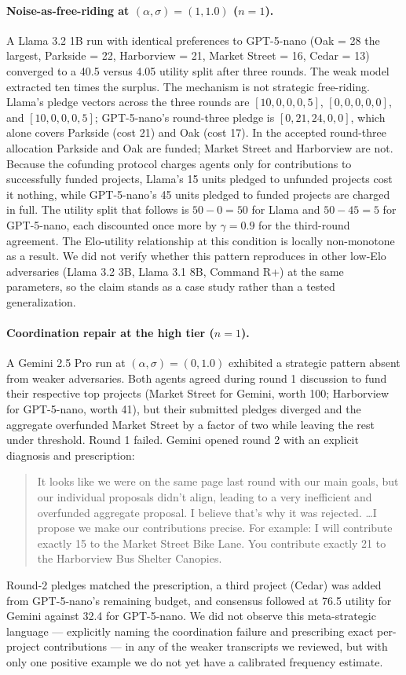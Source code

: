 \paragraph{Noise-as-free-riding at $(\alpha, \sigma) = (1, 1.0)$ ($n = 1$).} A Llama 3.2 1B run with identical preferences to GPT-5-nano (Oak = 28 the largest, Parkside = 22, Harborview = 21, Market Street = 16, Cedar = 13) converged to a 40.5 versus 4.05 utility split after three rounds. The weak model extracted ten times the surplus. The mechanism is not strategic free-riding. Llama's pledge vectors across the three rounds are $[10, 0, 0, 0, 5]$, $[0, 0, 0, 0, 0]$, and $[10, 0, 0, 0, 5]$; GPT-5-nano's round-three pledge is $[0, 21, 24, 0, 0]$, which alone covers Parkside (cost 21) and Oak (cost 17). In the accepted round-three allocation Parkside and Oak are funded; Market Street and Harborview are not. Because the cofunding protocol charges agents only for contributions to successfully funded projects, Llama's 15 units pledged to unfunded projects cost it nothing, while GPT-5-nano's 45 units pledged to funded projects are charged in full. The utility split that follows is $50 - 0 = 50$ for Llama and $50 - 45 = 5$ for GPT-5-nano, each discounted once more by $\gamma = 0.9$ for the third-round agreement. The Elo-utility relationship at this condition is locally non-monotone as a result. We did not verify whether this pattern reproduces in other low-Elo adversaries (Llama 3.2 3B, Llama 3.1 8B, Command R+) at the same parameters, so the claim stands as a case study rather than a tested generalization.

\paragraph{Coordination repair at the high tier ($n = 1$).} A Gemini 2.5 Pro run at $(\alpha, \sigma) = (0, 1.0)$ exhibited a strategic pattern absent from weaker adversaries. Both agents agreed during round 1 discussion to fund their respective top projects (Market Street for Gemini, worth 100; Harborview for GPT-5-nano, worth 41), but their submitted pledges diverged and the aggregate overfunded Market Street by a factor of two while leaving the rest under threshold. Round 1 failed. Gemini opened round 2 with an explicit diagnosis and prescription:
\begin{quote}
It looks like we were on the same page last round with our main goals, but our individual proposals didn't align, leading to a very inefficient and overfunded aggregate proposal. I believe that's why it was rejected. \ldots I propose we make our contributions precise. For example: I will contribute exactly 15 to the Market Street Bike Lane. You contribute exactly 21 to the Harborview Bus Shelter Canopies.
\end{quote}
Round-2 pledges matched the prescription, a third project (Cedar) was added from GPT-5-nano's remaining budget, and consensus followed at 76.5 utility for Gemini against 32.4 for GPT-5-nano. We did not observe this meta-strategic language --- explicitly naming the coordination failure and prescribing exact per-project contributions --- in any of the weaker transcripts we reviewed, but with only one positive example we do not yet have a calibrated frequency estimate.

